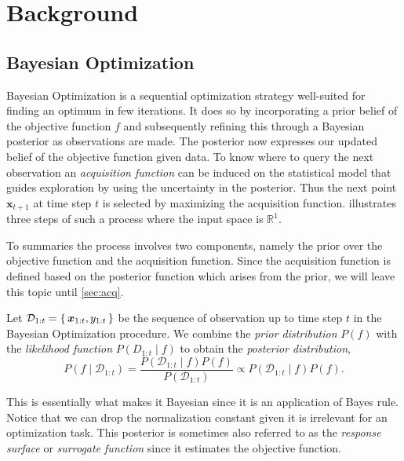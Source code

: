 \documentclass[conference,compsoc]{IEEEtran}
\theoremstyle{definition}
\begin{document}
\section{Background}\label{sec:background}

  \subsection{Bayesian Optimization}

        Bayesian Optimization is a sequential optimization strategy well-suited for finding an optimum in few iterations.
        It does so by incorporating a prior belief of the objective function $f$ and subsequently refining this through a Bayesian posterior as observations are made.
        The posterior now expresses our updated belief of the objective function given data.
        To know where to query the next observation an \emph{acquisition function} can be induced on the statistical model that guides exploration by using the uncertainty in the posterior.
        Thus the next point $\bm{x}_{t+1}$ at time step $t$ is selected by maximizing the acquisition function.
         illustrates three steps of such a process where the input space is $\mathbb{R}^1$.

        To summaries the process involves two components, namely the prior over the objective function and the acquisition function.
        Since the acquisition function is defined based on the posterior function which arises from the prior, we will leave this topic until \cref{sec:acq}.
        
        Let $\mathcal{D}_{1:t} = \set{\bm{x}_{1:t}, y_{1:t}}$ be the sequence of observation up to time step $t$ in the Bayesian Optimization procedure.
        We combine the \emph{prior distribution} $P(f)$ with the \emph{likelihood function} $P(D_{1:t}\mid f)$ to obtain the \emph{posterior distribution},
        \begin{equation}
            P(f\mid\mathcal{D}_{1:t}) = \frac{P(\mathcal{D}_{1:t}\mid f)P(f)}{P(\mathcal{D}_{1:t})} \propto P(\mathcal{D}_{1:t}\mid f)P(f).
        \end{equation}

        This is essentially what makes it Bayesian since it is an application of Bayes rule.
        Notice that we can drop the normalization constant given it is irrelevant for an optimization task.
        This posterior is sometimes also referred to as the \emph{response surface} or \emph{surrogate function} since it estimates the objective function.
\end{document}
